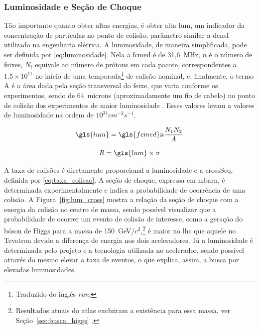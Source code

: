 \subsubsection{Luminosidade e Seção de Choque}
\label{sssec:Lum_Crosseq}
Tão importante quanto obter altas energias, é obter alta
\gls{lum}, um indicador da concentração 
de partículas no ponto de colisão, parâmetro similar a \gls{densI} 
utilizado na engenharia elétrica. A luminosidade, de maneira
simplificada, pode ser definida por
\ref{eq:luminosidade}. Nela a \gls{fcmed} é de 31,6~MHz, $n$ é o número de feixes, 
$N_i$ equivale ao número de prótons em cada pacote, correspondentes a $1.5\times10^{11}$ 
no início de uma temporada\footnote{Traduzido do inglês \emph{run}.} de colisão nominal, e,
finalmente, o termo A é a área dada pela seção transversal do feixe, que varia
conforme os experimentos, sendo de 64~microns (aproximadamente um fio de cabelo) 
no ponto de colisão dos experimentos de maior luminosidade \cite{webLHC}. 
Esses valores levam a valores de luminosidade na ordem de
$10^{34}cm^{-2}s^{-1}$.


\begin{equation} \label{eq:luminosidade}
\gls{lum}=\gls{fcmed}n\frac{N_1 N_2}{A}
\end{equation}

\begin{equation}
R = \gls{lum} \times \sigma
\label{eq:taxa_colisao}
\end{equation}

A taxa de colisões é diretamente proporcional a luminosidade e a \gls{crossSeq}, 
definida por \ref{eq:taxa_colisao}. A seção de choque, expressa em mbarn, 
é determinada experimentalmente e indica a probabilidade de ocorrência de uma colisão. 
A Figura~\ref{fig:lum_cross} mostra a relação da seção de choque com a energia
da colisão no centro de massa, sendo possível visualizar que a probabilidade 
de ocorrer um evento de colisão de interesse, como a geração do
bóson de Higgs para a massa de 150~GeV/$c^2$,\footnote{Resultados atuais do \gls{atlas} excluiram a
existência para essa massa, ver Seção~\ref{sec:busca_higgs} \cite{atlas_higgs}.} é maior no \gls{lhc} 
que aquele no Tevatron devido a diferença de energia nos dois aceleradores.
Já a luminosidade é determinada pelo projeto e a tecnologia utilizada no 
acelerador, sendo possível através do mesmo elevar a taxa de eventos, o que
explica, assim, a busca por elevadas luminosidades.

